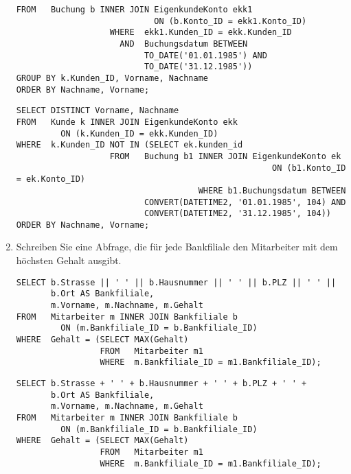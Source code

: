 \begin{enumerate}
\begin{lstlisting}[language=oracle_sql]
                   FROM   Buchung b INNER JOIN EigenkundeKonto ekk1
                            ON (b.Konto_ID = ekk1.Konto_ID)
                   WHERE  ekk1.Kunden_ID = ekk.Kunden_ID
                     AND  Buchungsdatum BETWEEN
                          TO_DATE('01.01.1985') AND
                          TO_DATE('31.12.1985'))
GROUP BY k.Kunden_ID, Vorname, Nachname
ORDER BY Nachname, Vorname;
        \end{lstlisting}
\clearpage
        \begin{mssql}[\FALSE]
        \end{mssql}
        \begin{lstlisting}[language=ms_sql]
SELECT DISTINCT Vorname, Nachname
FROM   Kunde k INNER JOIN EigenkundeKonto ekk
         ON (k.Kunden_ID = ekk.Kunden_ID)
WHERE  k.Kunden_ID NOT IN (SELECT ek.kunden_id
                   FROM   Buchung b1 INNER JOIN EigenkundeKonto ek
													ON (b1.Konto_ID = ek.Konto_ID)
									 WHERE b1.Buchungsdatum BETWEEN
                          CONVERT(DATETIME2, '01.01.1985', 104) AND
                          CONVERT(DATETIME2, '31.12.1985', 104))
ORDER BY Nachname, Vorname;
        \end{lstlisting}
        \item Schreiben Sie eine Abfrage, die für jede Bankfiliale den
        Mitarbeiter mit dem höchsten Gehalt ausgibt.
        \begin{oraclesql}[\FALSE]
        \end{oraclesql}
        \begin{lstlisting}[language=oracle_sql]
SELECT b.Strasse || ' ' || b.Hausnummer || ' ' || b.PLZ || ' ' ||
       b.Ort AS Bankfiliale,
       m.Vorname, m.Nachname, m.Gehalt
FROM   Mitarbeiter m INNER JOIN Bankfiliale b
         ON (m.Bankfiliale_ID = b.Bankfiliale_ID)
WHERE  Gehalt = (SELECT MAX(Gehalt)
                 FROM   Mitarbeiter m1
                 WHERE  m.Bankfiliale_ID = m1.Bankfiliale_ID);
        \end{lstlisting}
        \begin{mssql}[\FALSE]
        \end{mssql}
        \begin{lstlisting}[language=ms_sql]
SELECT b.Strasse + ' ' + b.Hausnummer + ' ' + b.PLZ + ' ' +
       b.Ort AS Bankfiliale,
       m.Vorname, m.Nachname, m.Gehalt
FROM   Mitarbeiter m INNER JOIN Bankfiliale b
         ON (m.Bankfiliale_ID = b.Bankfiliale_ID)
WHERE  Gehalt = (SELECT MAX(Gehalt)
                 FROM   Mitarbeiter m1
                 WHERE  m.Bankfiliale_ID = m1.Bankfiliale_ID);

\end{lstlisting}
\end{enumerate}
